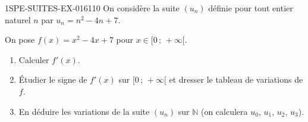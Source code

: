 \begin{exercice}{1SPE-SUITES-EX-016}{1}{10}
On considère la suite $(u_n)$ définie pour tout entier naturel $n$ par $u_n = n^2 - 4n + 7$.

On pose $f(x) = x^2 - 4x + 7$ pour $x \in [0\,;\,+\infty[$.
\begin{enumerate}
  \item Calculer $f'(x)$.
  \item Étudier le signe de $f'(x)$ sur $[0\,;\,+\infty[$ et dresser le tableau de variations de $f$.
  \item En déduire les variations de la suite $(u_n)$ sur $\mathbb{N}$ (on calculera $u_0$, $u_1$, $u_2$, $u_3$).
\end{enumerate}
\end{exercice}
